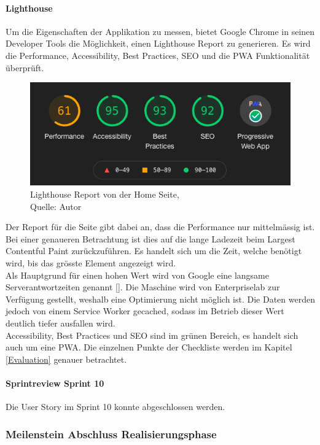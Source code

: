\paragraph{Lighthouse}
Um die Eigenschaften der Applikation zu messen, bietet Google Chrome in seinen Developer Tools die Möglichkeit, einen Lighthouse Report zu generieren. Es wird die Performance, Accessibility, Best Practices, \ac{SEO} und die \gls{PWA} Funktionalität überprüft. 
\begin{figure}[H]
	\centering
	\includegraphics[scale=0.6]{images/lighthouseReport.png}
	\caption[Lighthouse Report von der Home Seite]{Lighthouse Report von der Home Seite,\\ Quelle: Autor}
	\label{img: lighthouseReport}
\end{figure} 
Der Report für die Seite gibt dabei an, dass die Performance nur mittelmässig ist. Bei einer genaueren Betrachtung ist dies auf die lange Ladezeit beim Largest Contentful Paint zurückzuführen. Es handelt sich um die Zeit, welche benötigt wird, bis das grösste Element angezeigt wird. \\
Als Hauptgrund für einen hohen Wert wird von Google eine langsame Serverantwortzeiten genannt [\cite{lcp}]. Die Maschine wird von Enterpriselab zur Verfügung gestellt, weshalb eine Optimierung nicht möglich ist. Die Daten werden jedoch von einem Service Worker gecached, sodass im Betrieb dieser Wert deutlich tiefer ausfallen wird.\\
Accessibility, Best Practices und \ac{SEO} sind im grünen Bereich, es handelt sich auch um eine \gls{PWA}. 
Die einzelnen Punkte der Checkliste werden im Kapitel \ref{Evaluation} genauer betrachtet. 
\paragraph{Sprintreview Sprint 10}
Die \gls{User Story} im Sprint 10 konnte abgeschlossen werden. 

\subsubsection{Meilenstein Abschluss Realisierungsphase}
